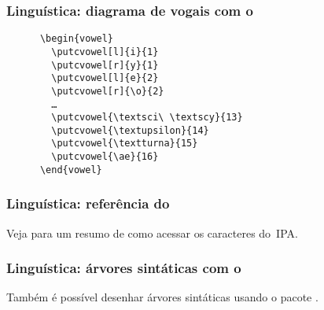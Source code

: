 \begin{frame}[fragile]
  \frametitle{Linguística: diagrama de vogais com o }
  \large
  \begin{minipage}{.45\textwidth}
    \begin{verbatim}
      \begin{vowel}
        \putcvowel[l]{i}{1}
        \putcvowel[r]{y}{1}
        \putcvowel[l]{e}{2}
        \putcvowel[r]{\o}{2}
        …
        \putcvowel{\textsci\ \textscy}{13}
        \putcvowel{\textupsilon}{14}
        \putcvowel{\textturna}{15}
        \putcvowel{\ae}{16}
      \end{vowel}
    \end{verbatim}
  \end{minipage}
  \hfill
  \begin{minipage}{.45\textwidth}
    \begin{vowel}
    \end{vowel}
  \end{minipage}
\end{frame}

\begin{frame}
  \frametitle{Linguística: referência do }
  \huge
  Veja  para um resumo de como acessar os
  caracteres do~IPA.
\end{frame}

\begin{frame}
  \frametitle{Linguística: árvores sintáticas com o }
  \huge
  Também é possível desenhar árvores sintáticas usando o pacote
  .
\end{frame}

